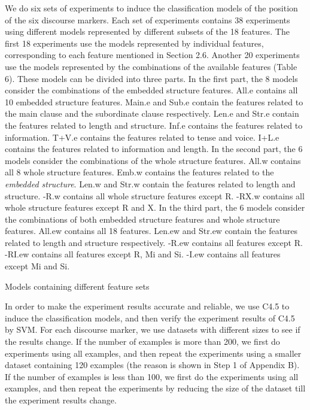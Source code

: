 \documentclass[english]{jnlp_1.3e}
\begin{document}
We do six sets of experiments to induce the classification models of the 
position of the six discourse markers. Each set of experiments
contains 38 experiments using different models represented by different 
subsets of the 18 features. The first 18 experiments use 
the models represented by individual features, corresponding to each feature
mentioned in Section 2.6. Another 20 experiments use the models 
represented by the combinations of the available features (Table 6). 
These models can be divided into three parts. In the first part, the 
8 models consider the combinations of the embedded structure features. 
All.e contains all 10 embedded structure features. Main.e and Sub.e 
contain the features related to the main clause and the 
subordinate clause respectively. Len.e and Str.e contain the features 
related to length and structure. Inf.e contains the features related to 
information. T+V.e contains the features related to tense and voice. 
I+L.e contains the features related to information and length.
In the second part, the 6 models consider the combinations of the 
whole structure features. All.w contains all 8 whole structure features. 
Emb.w contains the features related to the \textit{embedded structure}. Len.w
and Str.w contain the features related to length and structure. -R.w contains
all whole structure features except R. -RX.w contains all whole structure
features except R and X. In the third part, the 6 models consider the combinations
of both embedded structure features and whole structure 
features. All.ew contains all 18 features. Len.ew and Str.ew 
contain the features related to length and structure respectively. 
-R.ew contains all features except R. -RI.ew contains all features except R, 
Mi and Si. -I.ew contains all features except Mi and Si.

\begin{table}[t]
\caption{Models containing different feature sets}

\end{table}


In order to make the experiment results accurate and reliable,
we use C4.5 to induce the classification models, and then verify 
the experiment results of C4.5 by SVM. For each discourse marker, we use 
datasets with different sizes to see if the results change. 
If the number of examples is more than 200, 
we first do experiments using all examples, and then 
repeat the experiments using a smaller dataset 
containing 120 examples (the reason is shown in Step 1 of Appendix B).
If the number of examples is less than 100, we
first do the experiments using all examples, and then repeat the
experiments by reducing the size of the dataset till
the experiment results change. 
\end{document}
